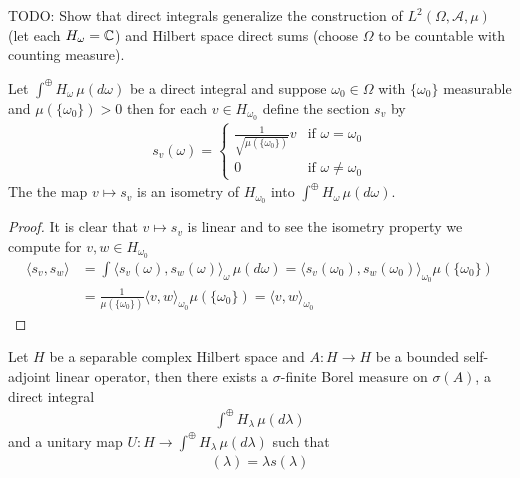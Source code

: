 TODO: Show that direct integrals generalize the construction of $L^2(\Omega, \mathcal{A}, \mu)$ (let each $H_\omega = \mathbb{C}$) and Hilbert space direct sums (choose $\Omega$ to be countable with counting measure).

\begin{prop}\label{hilbert:DirectIntegralSubspaces} Let $\int^\oplus H_\omega \, \mu(d\omega)$ be a direct integral and suppose $\omega_0 \in \Omega$ with $\lbrace \omega_0 \rbrace$ measurable and $\mu( \lbrace \omega_0 \rbrace) > 0$ then for each $v \in H_{\omega_0}$ define the section $s_v$ by
\begin{align*}
s_v(\omega) = 
\begin{cases}
\frac{1}{\sqrt{\mu(\lbrace \omega_0 \rbrace)}} v & \text{if $\omega = \omega_0$} \\
0 & \text{if $\omega \neq \omega_0$} 
\end{cases}
\end{align*}
The the map $v \mapsto s_v$ is an isometry of $H_{\omega_0}$ into $\int^\oplus H_\omega \, \mu(d\omega)$.
\end{prop}
\begin{proof}
It is clear that $v \mapsto s_v$ is linear and to see the isometry property
 we compute for $v,w \in H_{\omega_0}$
\begin{align*}
\langle s_v, s_w \rangle &= \int \langle s_v(\omega), s_w(\omega) \rangle_\omega \, \mu(d\omega) = \langle s_v(\omega_0), s_w(\omega_0) \rangle_{\omega_0} \mu(\lbrace \omega_0 \rbrace) \\
&=\frac{1}{\mu(\lbrace \omega_0 \rbrace)} \langle v,w \rangle_{\omega_0} \mu(\lbrace \omega_0 \rbrace) = \langle v,w \rangle_{\omega_0}
\end{align*}
\end{proof}

\begin{thm}\label{hilbert:SpectralTheoremBoundedSelfAdjointDirectIntegral}Let $H$ be a separable complex Hilbert space and $A : H \to H$ be a bounded self-adjoint linear operator, then there exists a $\sigma$-finite Borel measure on $\sigma(A)$, a direct integral 
\begin{align*}
\int^\oplus H_\lambda \, \mu(d\lambda)
\end{align*}
and a unitary map $U: H \to \int^\oplus H_\lambda \, \mu(d\lambda)$ such that 
\begin{align*}
[UAU^{-1}(s)] (\lambda) = \lambda s(\lambda) 
\end{align*}
\end{thm}

